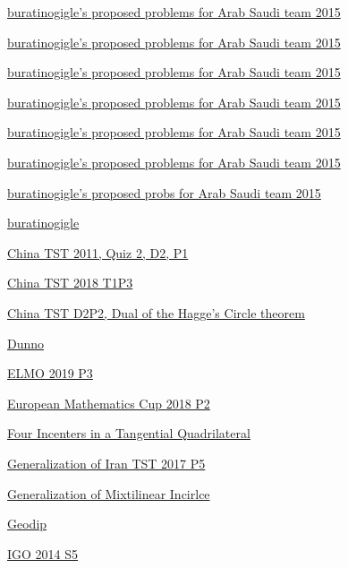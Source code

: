\hyperref  [problem:buratinogigle's proposed problems for Arab Saudi team 2015]{buratinogigle's proposed problems for Arab Saudi team 2015}

\hyperref  [problem:buratinogigle's proposed problems for Arab Saudi team 2015]{buratinogigle's proposed problems for Arab Saudi team 2015}

\hyperref  [problem:buratinogigle's proposed problems for Arab Saudi team 2015]{buratinogigle's proposed problems for Arab Saudi team 2015}

\hyperref  [problem:buratinogigle's proposed problems for Arab Saudi team 2015]{buratinogigle's proposed problems for Arab Saudi team 2015}

\hyperref  [problem:buratinogigle's proposed problems for Arab Saudi team 2015]{buratinogigle's proposed problems for Arab Saudi team 2015}

\hyperref  [problem:buratinogigle's proposed problems for Arab Saudi team 2015]{buratinogigle's proposed problems for Arab Saudi team 2015}

\hyperref  [problem:buratinogigle's proposed probs for Arab Saudi team 2015]{buratinogigle's proposed probs for Arab Saudi team 2015}

\hyperref  [problem:buratinogigle]{buratinogigle}

\hyperref  [problem:China TST 2011, Quiz 2, D2, P1]{China TST 2011, Quiz 2, D2, P1}

\hyperref  [problem:China TST 2018 T1P3]{China TST 2018 T1P3}

\hyperref  [problem:China TST D2P2, Dual of the Hagge's Circle theorem]{China TST D2P2, Dual of the Hagge's Circle theorem}

\hyperref  [problem:Dunno]{Dunno}

\hyperref  [problem:ELMO 2019 P3]{ELMO 2019 P3}

\hyperref  [problem:European Mathematics Cup 2018 P2]{European Mathematics Cup 2018 P2}

\hyperref  [problem:Four Incenters in a Tangential Quadrilateral]{Four Incenters in a Tangential Quadrilateral}

\hyperref  [problem:Generalization of Iran TST 2017 P5]{Generalization of Iran TST 2017 P5}

\hyperref  [problem:Generalization of Mixtilinear Incirlce]{Generalization of Mixtilinear Incirlce}

\hyperref  [problem:Geodip]{Geodip}

\hyperref  [problem:IGO 2014 S5]{IGO 2014 S5}

